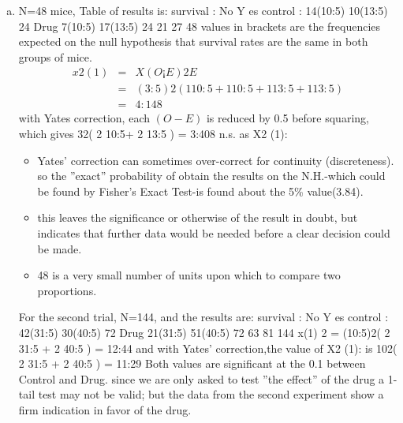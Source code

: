 \documentclass[a4paper,12pt]{article}
\begin{document}
\begin{enumerate}[(a)]
\item N=48 mice, Table of results is:
survival : No Y es
control : 14(10:5) 10(13:5) 24
Drug 7(10:5) 17(13:5) 24
21 27 48
values in brackets are the frequencies expected on the null hypothesis that survival rates
are the same in both groups of mice.
\begin{eqnarray*}x2
(1) &=&
X(O ¡ E)2
E
\\ &=& (3:5)2(
1
10:5
+
1
10:5
+
1
13:5
+
1
13:5
) \\ &=&  4:148
\end{eqnarray*}
with Yates correction, each $(O-E)$ is reduced by 0.5 before squaring, which gives 32( 2
10:5+
2
13:5 ) = 3:408 n.s. as X2
(1):
\begin{itemize}
    \item Yates’ correction can sometimes over-correct for continuity (discreteness). so the ”exact”
probability of obtain the results on the N.H.-which could be found by Fisher’s
Exact Test-is found about the 5\% value(3.84). 
\item this leaves the significance or otherwise
of the result in doubt, but indicates that further data would be needed before a clear
decision could be made. 
\item 48 is a very small number of units upon which to compare two
proportions.
\end{itemize}

For the second trial, N=144, and the results are:
survival : No Y es
control : 42(31:5) 30(40:5) 72
Drug 21(31:5) 51(40:5) 72
63 81 144
x(1)
2 = (10:5)2(
2
31:5
+
2
40:5
) = 12:44
and with Yates’ correction,the value of X2
(1): is 102( 2
31:5 + 2
40:5 ) = 11:29
Both values are significant at the 0.1%
between Control and Drug.
since we are only asked to test ”the effect” of the drug a 1-tail test may not be valid;
but the data from the second experiment show a firm indication in favor of the drug.
\end{enumerate}
\end{document}
